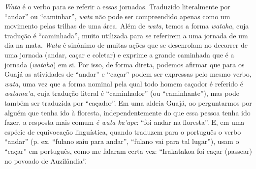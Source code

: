 \emph{Wata} é o verbo para se referir a essas jornadas. Traduzido
literalmente por ``andar'' ou ``caminhar'', \emph{wata} não pode ser
compreendido apenas como um movimento pelas trilhas de uma área. Além de
\emph{wata}, temos a forma \emph{wataha}, cuja tradução é ``caminhada'',
muito utilizada para se referirem a uma jornada de um dia na mata.
\emph{Wata} é sinônimo de muitas ações que se desenrolam no decorrer de
uma jornada (andar, caçar e coletar) e exprime a grande caminhada que é
a jornada (\emph{wataha}) em si. Por isso, de forma direta, podemos
afirmar que para os Guajá as atividades de ``andar'' e ``caçar'' podem ser
expressas pelo mesmo verbo, \emph{wata}, uma vez que a forma nominal
pela qual todo homem caçador é referido é \emph{watama'a}, cuja tradução
literal é ``caminhador'' (ou ``caminhante''), mas pode também ser traduzida
por ``caçador''. Em uma aldeia Guajá, ao perguntarmos por alguém que tenha
ido à floresta, independentemente do que essa pessoa tenha ido fazer, a
resposta mais comum \emph{é wata ka'ape}: ``foi andar na floresta''. E, em
uma espécie de equivocação linguística, quando traduzem para o português
o verbo ``andar'' (p. ex. ``fulano saiu para andar'', ``fulano vai para
tal lugar''), usam o ``caçar'' em português, como me falaram certa vez:
``Irakatakoa foi caçar (passear) no povoado de Auzilândia''.

